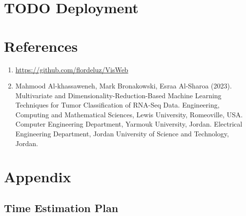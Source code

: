 \documentclass[a4paper]{article}
\begin{document}
\section{{\bfseries\sffamily TODO} Deployment}
\label{sec:orga62da9b}

\section{References}
\label{sec:orgb0eb6a6}

\begin{enumerate}
\item \url{https://github.com/flordeluz/VisWeb}
\item Mahmood Al-khassaweneh, Mark Bronakowski, Esraa Al-Sharoa (2023). Multivariate and Dimensionality-Reduction-Based Machine Learning Techniques for Tumor Classification of RNA-Seq Data. Engineering, Computing and Mathematical Sciences, Lewis University, Romeoville, USA. Computer Engineering Department, Yarmouk University, Jordan. Electrical Engineering Department, Jordan University of Science and Technology, Jordan.
\end{enumerate}

\clearpage
\section{Appendix}
\label{sec:org388dbea}

\subsection{Time Estimation Plan}
\label{sec:orgc385e5c}
\end{document}
